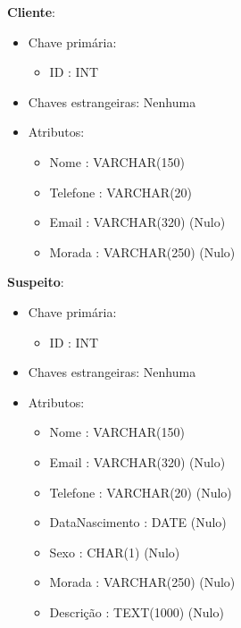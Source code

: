 \documentclass[a4paper,12pt]{scrreprt}
\begin{document}
        \vspace{0.5cm}

        \textbf{Cliente}:
        \begin{itemize}
            \item Chave primária:
                \begin{itemize}
                    \item ID : INT
                \end{itemize}
            \item Chaves estrangeiras: Nenhuma
            \item Atributos:
                \begin{itemize}
                    \item Nome : VARCHAR(150)
                    \item Telefone : VARCHAR(20)
                    \item Email : VARCHAR(320) (Nulo)
                    \item Morada : VARCHAR(250) (Nulo)
                \end{itemize}
        \end{itemize}

        \clearpage

        \textbf{Suspeito}:
        \begin{itemize}
            \item Chave primária:
                \begin{itemize}
                    \item ID : INT
                \end{itemize}
            \item Chaves estrangeiras: Nenhuma
            \item Atributos:
                \begin{itemize}
                    \item Nome : VARCHAR(150)
                    \item Email : VARCHAR(320) (Nulo)
                    \item Telefone : VARCHAR(20) (Nulo)
                    \item DataNascimento : DATE (Nulo)
                    \item Sexo : CHAR(1) (Nulo)
                    \item Morada : VARCHAR(250) (Nulo)
                    \item Descrição : TEXT(1000) (Nulo)                    
                \end{itemize}
        \end{itemize}
\end{document}
